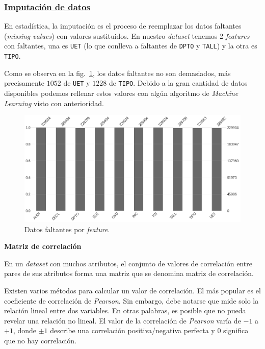 \documentclass[a4paper,12pt]{article}
\begin{document}
		\subsubsection{\href{https://github.com/GeraCollante/tesis-icomp-machinelearning/blob/main/DataImputation.ipynb}{\color{blue}Imputación de datos}}\label{DataImputation}
				 
		En estadística, la imputación es el proceso de reemplazar los datos faltantes (\textit{missing values}) con valores sustituidos. En nuestro \textit{dataset} tenemos 2 \textit{features} con faltantes, una es \texttt{UET} (lo que conlleva a faltantes de \texttt{DPTO} y \texttt{TALL}) y la otra es \texttt{TIPO}.
				
		Como se observa en la fig.~\ref{fig:missingvalue}, los datos faltantes no son demasiados, más precisamente $1052$ de \texttt{UET} y $1228$ de \texttt{TIPO}. Debido a la gran cantidad de datos disponibles podemos rellenar estos valores con algún algoritmo de \textit{Machine Learning} visto con anterioridad.
				
		\begin{figure}[H]
			\begin{center}
				\includegraphics[width=1\textwidth]{tesis_66.png}
				\caption{Datos faltantes por \textit{feature}.}
				\label{fig:missingvalue}
			\end{center}
		\end{figure}
				
		\textbf{Matriz de correlación}
				
		En un \textit{dataset} con muchos atributos, el conjunto de valores de correlación entre pares de sus atributos forma una matriz que se denomina matriz de correlación.
				
		Existen varios métodos para calcular un valor de correlación. El más popular es el coeficiente de correlación de \textit{Pearson}. Sin embargo, debe notarse que mide solo la relación lineal entre dos variables. En otras palabras, es posible que no pueda revelar una relación no lineal. El valor de la correlación de \textit{Pearson} varía de $-1$ a $+1$, donde $\pm1$ describe una correlación positiva/negativa perfecta y $0$ significa que no hay correlación. \citep{corrmatrix}
				
\end{document}
